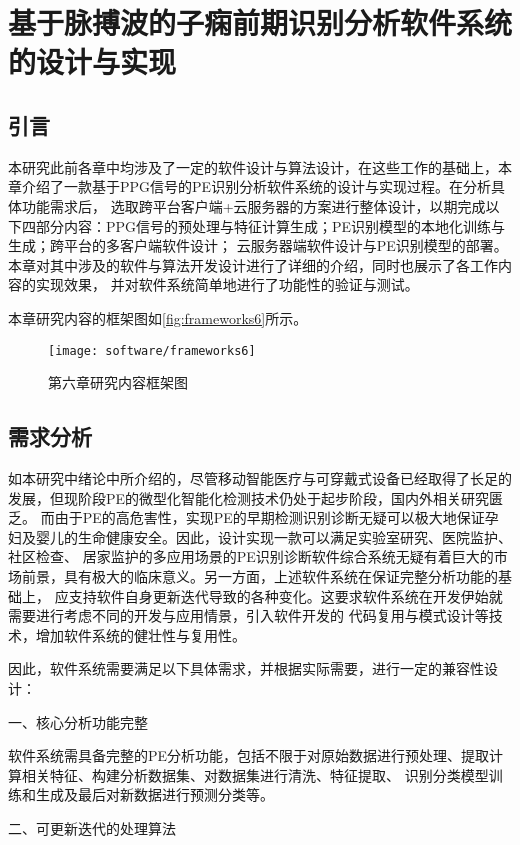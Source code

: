 \chapter{基于脉搏波的子痫前期识别分析软件系统的设计与实现}
\section{引言}
本研究此前各章中均涉及了一定的软件设计与算法设计，在这些工作的基础上，本章介绍了一款基于PPG信号的PE识别分析软件系统的设计与实现过程。在分析具体功能需求后，
选取跨平台客户端+云服务器的方案进行整体设计，以期完成以下四部分内容：PPG信号的预处理与特征计算生成；PE识别模型的本地化训练与生成；跨平台的多客户端软件设计；
云服务器端软件设计与PE识别模型的部署。本章对其中涉及的软件与算法开发设计进行了详细的介绍，同时也展示了各工作内容的实现效果，
并对软件系统简单地进行了功能性的验证与测试。

本章研究内容的框架图如\autoref{fig:frameworks6}所示。

\begin{figure}[htbp]
    \centering
    \texttt{[image: software/frameworks6]}
    \caption{\label{fig:frameworks6}第六章研究内容框架图}
\end{figure}

\section{需求分析}
如本研究中绪论中所介绍的，尽管移动智能医疗与可穿戴式设备已经取得了长足的发展，但现阶段PE的微型化智能化检测技术仍处于起步阶段，国内外相关研究匮乏。
而由于PE的高危害性，实现PE的早期检测识别诊断无疑可以极大地保证孕妇及婴儿的生命健康安全。因此，设计实现一款可以满足实验室研究、医院监护、社区检查、
居家监护的多应用场景的PE识别诊断软件综合系统无疑有着巨大的市场前景，具有极大的临床意义。另一方面，上述软件系统在保证完整分析功能的基础上，
应支持软件自身更新迭代导致的各种变化。这要求软件系统在开发伊始就需要进行考虑不同的开发与应用情景，引入软件开发的
代码复用与模式设计等技术，增加软件系统的健壮性与复用性\cite{Enrich2018,CJ2020}。

因此，软件系统需要满足以下具体需求，并根据实际需要，进行一定的兼容性设计：

一、核心分析功能完整

软件系统需具备完整的PE分析功能，包括不限于对原始数据进行预处理、提取计算相关特征、构建分析数据集、对数据集进行清洗、特征提取、
识别分类模型训练和生成及最后对新数据进行预测分类等。

二、可更新迭代的处理算法

